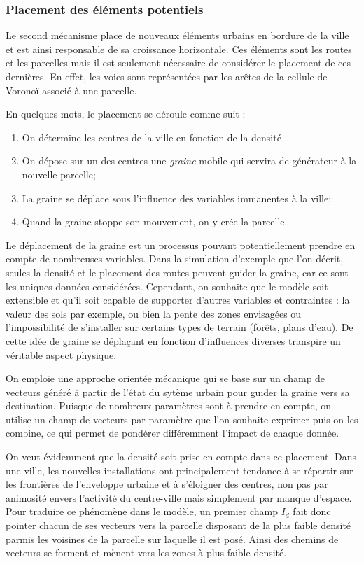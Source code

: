 \documentclass[12pt]{article}
\begin{document}
\subsubsection{Placement des éléments potentiels}

Le second mécanisme place de nouveaux éléments urbains en bordure de
la ville et est ainsi responsable de sa croissance horizontale. Ces
éléments sont les routes et les parcelles mais il est seulement
nécessaire de considérer le placement de ces dernières. En effet, les
voies sont représentées par les arêtes de la cellule de Voronoï
associé à une parcelle.

En quelques mots, le placement se déroule comme suit :

\begin{enumerate}
\item{On détermine les centres de la ville en fonction de la densité}
\item{On dépose sur un des centres une \textit{graine} mobile qui
  servira de générateur à la nouvelle parcelle;}
\item{La graine se déplace sous l'influence des variables immanentes à
  la ville;}
\item{Quand la graine stoppe son mouvement, on y crée la parcelle.}
\end{enumerate}

Le déplacement de la graine est un processus pouvant potentiellement
prendre en compte de nombreuses variables. Dans la simulation
d'exemple que l'on décrit, seules la densité et le placement des
routes peuvent guider la graine, car ce sont les uniques données
considérées. Cependant, on souhaite que le modèle soit extensible et
qu'il soit capable de supporter d'autres variables et contraintes : la
valeur des sols par exemple, ou bien la pente des zones envisagées ou
l'impossibilité de s'installer sur certains types de terrain (forêts,
plans d'eau). De cette idée de graine se déplaçant en fonction
d'influences diverses transpire un véritable aspect physique.

On emploie une approche orientée mécanique qui se base sur un champ de
vecteurs généré à partir de l'état du sytème urbain pour guider la
graine vers sa destination. Puisque de nombreux paramètres sont à
prendre en compte, on utilise un champ de vecteurs par paramètre que
l'on souhaite exprimer puis on les combine, ce qui permet de pondérer
différemment l'impact de chaque donnée.

On veut évidemment que la densité soit prise en compte dans ce
placement. Dans une ville, les nouvelles installations ont
principalement tendance à se répartir sur les frontières de
l'enveloppe urbaine et à s'éloigner des centres, non pas par animosité
envers l'activité du centre-ville mais simplement par manque
d'espace. Pour traduire ce phénomène dans le modèle, un premier champ
$I_d$ fait donc pointer chacun de ses vecteurs vers la parcelle
disposant de la plus faible densité parmis les voisines de la parcelle
sur laquelle il est posé. Ainsi des chemins de vecteurs se forment et
mènent vers les zones à plus faible densité.
\end{document}
